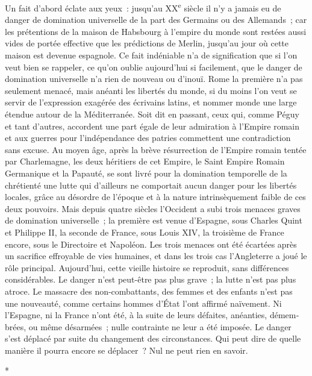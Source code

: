 \documentclass[french,twoside]{book} %
\begin{document}
Un fait d'abord éclate aux yeux : jusqu'au XX\textsuperscript{e} siècle il n'y a jamais eu de danger de domination universelle de la part des Germains ou des Allemands ; car les prétentions de la maison de Habsbourg à l'empire du monde sont restées aussi vides de portée effective que les prédictions de Merlin, jusqu'au jour où cette maison est devenue espagnole. Ce fait indéniable n'a de signifi­cation que si l'on veut bien se rappeler, ce qu'on oublie aujourd'hui si facile­ment, que le danger de domination universelle n'a rien de nouveau ou d'inouï. Rome la première n'a pas seulement menacé, mais anéanti les libertés du monde, si du moins l'on veut se servir de l'expression exagérée des écrivains latins, et nommer monde une large étendue autour de la Méditerranée. Soit dit en passant, ceux qui, comme Péguy et tant d'autres, accordent une part égale de leur admiration à l'Empire romain et aux guerres pour l'indépendance des patries commettent une contradiction sans excuse. Au moyen âge, après la brève résurrection de l'Empire romain tentée par Charlemagne, les deux héri­tiers de cet Empire, le Saint Empire Romain Germanique et la Papauté, se sont livré pour la domination temporelle de la chrétienté une lutte qui d'ailleurs ne comportait aucun danger pour les libertés locales, grâce au désordre de l'époque et à la nature intrinsèquement faible de ces deux pouvoirs. Mais depuis quatre siècles l'Occident a subi trois menaces graves de domination universelle ; la première est venue d'Espagne, sous Charles Quint et Philippe II, la seconde de France, sous Louis XIV, la troisième de France encore, sous le Directoire et Napoléon. Les trois menaces ont été écartées après un sacrifice effroyable de vies humaines, et dans les trois cas l'Angleterre a joué le rôle principal. Aujourd'hui, cette vieille histoire se reproduit, sans différences considérables. Le danger n'est peut-être pas plus grave ; la lutte n'est pas plus atroce. Le massacre des non-combattants, des femmes et des enfants n'est pas une nouveauté, comme certains hommes d'État l'ont affirmé naïvement. Ni l'Espagne, ni la France n'ont été, à la suite de leurs défaites, anéanties, démem­brées, ou même désarmées ; nulle contrainte ne leur a été imposée. Le danger s'est déplacé par suite du changement des circonstances. Qui peut dire de quelle manière il pourra encore se déplacer ? Nul ne peut rien en savoir.\par

\begin{center}
\noindent \centerline{*}\par
\end{center}
\end{document}
